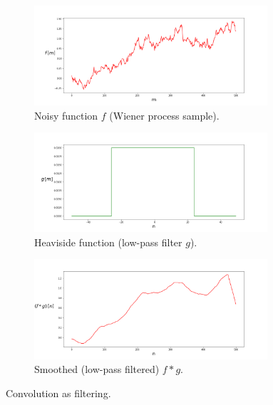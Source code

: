 \begin{figure}
    \centering
    \begin{subfigure}[b]{.49\textwidth}
        \centering
        \includegraphics[width=0.95\textwidth]{figures/neural_networks/unsmoothed.png}
        \caption{Noisy function \(f\) (Wiener process sample).}\label{fig:convnoisy}
    \end{subfigure}

    \begin{subfigure}[b]{.49\textwidth}
        \centering
        \includegraphics[width=0.95\textwidth]{figures/neural_networks/kernel.png}
        \caption{Heaviside function (low-pass filter \(g\)).}\label{fig:convfilter}
    \end{subfigure}
    \begin{subfigure}[b]{.49\textwidth}
        \centering
        \includegraphics[width=0.95\textwidth]{figures/neural_networks/smoothed.png}
        \caption{Smoothed (low-pass filtered) \(f * g\).}\label{fig:convsmooth}
    \end{subfigure}
    \caption{Convolution as filtering.}\label{fig:convfiltering}
\end{figure}